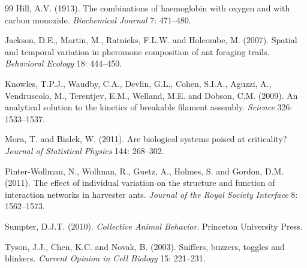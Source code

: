 \documentclass[10pt,a4paper,twocolumn]{article}
\theoremstyle{definition}
\begin{document}
\begin{thebibliography}{99}
Hill, A.V. (1913). The combinations of haemoglobin with oxygen
and with carbon monoxide. \emph{Biochemical Journal} 7: 471--480.

Jackson, D.E., Martin, M., Ratnieks, F.L.W. and Holcombe, M.
(2007). Spatial and temporal variation in pheromone composition
of ant foraging trails. \emph{Behavioral Ecology} 18: 444--450.

Knowles, T.P.J., Waudby, C.A., Devlin, G.L., Cohen, S.I.A.,
Aguzzi, A., Vendruscolo, M., Terentjev, E.M., Welland, M.E. and
Dobson, C.M. (2009). An analytical solution to the kinetics of
breakable filament assembly. \emph{Science} 326: 1533--1537.

Mora, T. and Bialek, W. (2011). Are biological systems poised
at criticality? \emph{Journal of Statistical Physics} 144:
268--302.

Pinter-Wollman, N., Wollman, R., Guetz, A., Holmes, S. and
Gordon, D.M. (2011). The effect of individual variation on the
structure and function of interaction networks in harvester
ants. \emph{Journal of the Royal Society Interface} 8: 1562--1573.

Sumpter, D.J.T. (2010). \emph{Collective Animal Behavior}.
Princeton University Press.

Tyson, J.J., Chen, K.C. and Novak, B. (2003). Sniffers, buzzers,
toggles and blinkers. \emph{Current Opinion in Cell Biology} 15:
221--231.

\end{thebibliography}
\end{document}
